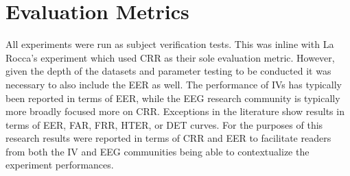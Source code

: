 \medskip
\noindent{}
\medskip

\section{Evaluation Metrics}

All experiments were run as subject verification tests. This was inline with La Rocca's experiment which used \ac{CRR} as their sole evaluation metric. However, given the depth of the datasets and parameter testing to be conducted it was necessary to also include the \ac{EER} as well. The performance of \acp{IV} has typically been reported in terms of \ac{EER}, while the \ac{EEG} research community is typically more broadly focused more on \ac{CRR}. Exceptions in the literature \cite{Yang2016, Marcel2007a, Nguyen2013} show results in terms of \ac{EER}, \ac{FAR}, \ac{FRR}, \ac{HTER}, or \ac{DET} curves. For the purposes of this research results were reported in terms of \ac{CRR} and \ac{EER} to facilitate readers from both the \ac{IV} and \ac{EEG} communities being able to contextualize the experiment performances.

